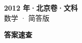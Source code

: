 \documentclass[zihao=-4, a4paper]{ctexart}
\begin{document}
\begin{center}
  {\Large\bfseries 2012 年·北京卷·文科}\\[4pt]
  {\large 数学 · 简答版}
\end{center}
\medskip
{}

\clearpage
{}
\begin{center}{\Large\bfseries 答案速查}\end{center}
\medskip

\end{document}
